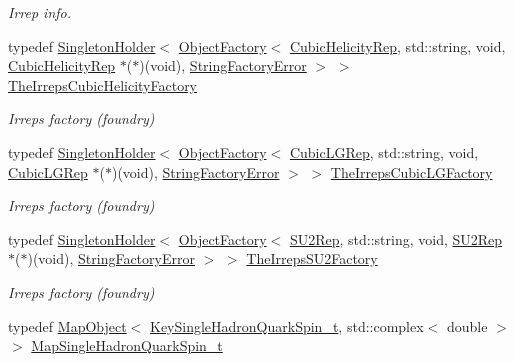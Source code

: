 \begin{DoxyCompactItemize}
\begin{DoxyCompactList}\small\item\em Irrep info. \end{DoxyCompactList}\item 
typedef \mbox{\hyperlink{classUtil_1_1SingletonHolder}{Singleton\+Holder}}$<$ \mbox{\hyperlink{classUtil_1_1ObjectFactory}{Object\+Factory}}$<$ \mbox{\hyperlink{structHadron_1_1CubicHelicityRep}{Cubic\+Helicity\+Rep}}, std\+::string, void, \mbox{\hyperlink{structHadron_1_1CubicHelicityRep}{Cubic\+Helicity\+Rep}} $\ast$($\ast$)(void), \mbox{\hyperlink{structUtil_1_1StringFactoryError}{String\+Factory\+Error}} $>$ $>$ \mbox{\hyperlink{namespaceHadron_ae17c10048cdbba5312fcaa06692d632a}{The\+Irreps\+Cubic\+Helicity\+Factory}}
\begin{DoxyCompactList}\small\item\em Irreps factory (foundry) \end{DoxyCompactList}\item 
typedef \mbox{\hyperlink{classUtil_1_1SingletonHolder}{Singleton\+Holder}}$<$ \mbox{\hyperlink{classUtil_1_1ObjectFactory}{Object\+Factory}}$<$ \mbox{\hyperlink{structHadron_1_1CubicLGRep}{Cubic\+L\+G\+Rep}}, std\+::string, void, \mbox{\hyperlink{structHadron_1_1CubicLGRep}{Cubic\+L\+G\+Rep}} $\ast$($\ast$)(void), \mbox{\hyperlink{structUtil_1_1StringFactoryError}{String\+Factory\+Error}} $>$ $>$ \mbox{\hyperlink{namespaceHadron_a7b18115fc67c9fdbfd26511633229b99}{The\+Irreps\+Cubic\+L\+G\+Factory}}
\begin{DoxyCompactList}\small\item\em Irreps factory (foundry) \end{DoxyCompactList}\item 
typedef \mbox{\hyperlink{classUtil_1_1SingletonHolder}{Singleton\+Holder}}$<$ \mbox{\hyperlink{classUtil_1_1ObjectFactory}{Object\+Factory}}$<$ \mbox{\hyperlink{structHadron_1_1SU2Rep}{S\+U2\+Rep}}, std\+::string, void, \mbox{\hyperlink{structHadron_1_1SU2Rep}{S\+U2\+Rep}} $\ast$($\ast$)(void), \mbox{\hyperlink{structUtil_1_1StringFactoryError}{String\+Factory\+Error}} $>$ $>$ \mbox{\hyperlink{namespaceHadron_a48c24ae97c1fd9057ed63227b8d89834}{The\+Irreps\+S\+U2\+Factory}}
\begin{DoxyCompactList}\small\item\em Irreps factory (foundry) \end{DoxyCompactList}\item 
typedef \mbox{\hyperlink{classADAT_1_1MapObject}{Map\+Object}}$<$ \mbox{\hyperlink{structHadron_1_1KeySingleHadronQuarkSpin__t}{Key\+Single\+Hadron\+Quark\+Spin\+\_\+t}}, std\+::complex$<$ double $>$ $>$ \mbox{\hyperlink{namespaceHadron_a22279e56b59508dc8dd2c8991dc911fd}{Map\+Single\+Hadron\+Quark\+Spin\+\_\+t}}

\end{DoxyCompactItemize}
